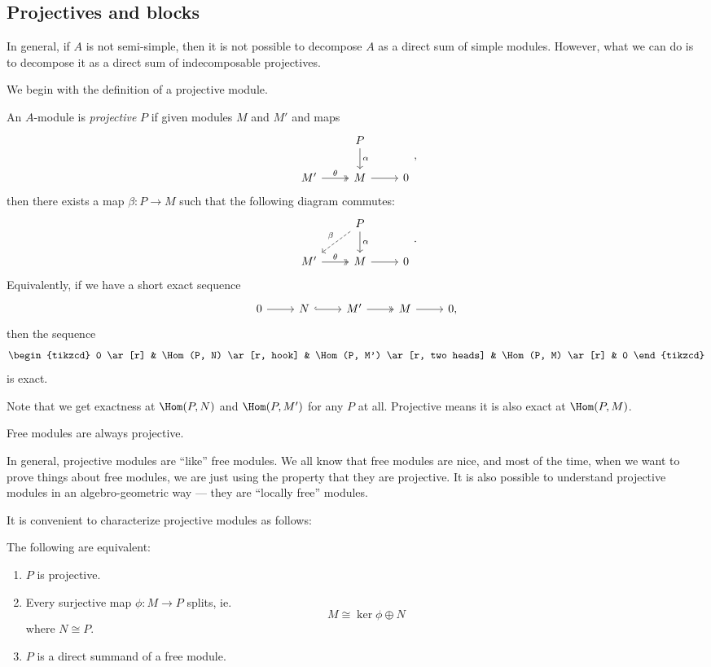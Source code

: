 \documentclass[a4paper]{article}
\begin{document}
\subsection{Projectives and blocks}
In general, if $A$ is not semi-simple, then it is not possible to decompose $A$ as a direct sum of simple modules. However, what we can do is to decompose it as a direct sum of indecomposable projectives.

We begin with the definition of a projective module.

\begin{defi}
  An $A$-module is \emph{projective} $P$ if given modules $M$ and $M'$ and maps
  \[
    \begin{tikzcd}
      & P \ar[d, "\alpha"]\\
      M' \ar[r, two heads, "\theta"] & M \ar[r] & 0
    \end{tikzcd},
  \]
  then there exists a map $\beta: P \to M$ such that the following diagram commutes:
  \[
    \begin{tikzcd}
      & P \ar[d, "\alpha"] \ar[ld, dashed, "\beta"']\\
      M' \ar[r, two heads, "\theta"] & M \ar[r] & 0
    \end{tikzcd}.
  \]
  Equivalently, if we have a short exact sequence
  \[
    \begin{tikzcd}
      0 \ar[r] & N \ar[r, hook] & M' \ar[r, two heads] & M \ar[r] & 0,
    \end{tikzcd}
  \]
  then the sequence
  \[
    \begin{tikzcd}
      0 \ar[r] & \Hom(P, N) \ar[r, hook] & \Hom(P, M') \ar[r, two heads] & \Hom(P, M) \ar[r] & 0
    \end{tikzcd}
  \]
  is exact.
\end{defi}
Note that we get exactness at $\Hom(P, N)$ and $\Hom(P, M')$ for any $P$ at all. Projective means it is also exact at $\Hom(P, M)$.

\begin{eg}
  Free modules are always projective.
\end{eg}
In general, projective modules are ``like'' free modules. We all know that free modules are nice, and most of the time, when we want to prove things about free modules, we are just using the property that they are projective. It is also possible to understand projective modules in an algebro-geometric way --- they are ``locally free'' modules.

It is convenient to characterize projective modules as follows:
\begin{lemma}
  The following are equivalent:
  \begin{enumerate}
    \item $P$ is projective.
    \item Every surjective map $\phi: M \to P$ splits, ie.
      \[
        M \cong \ker \phi \oplus N
      \]
      where $N \cong P$.
    \item $P$ is a direct summand of a free module.
  \end{enumerate}
\end{lemma}
\end{document}
